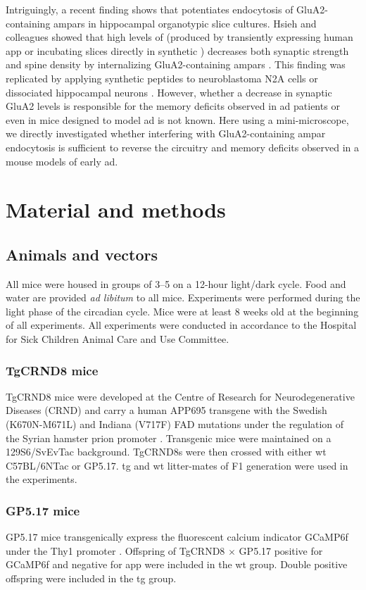 Intriguingly, a recent finding shows that \abeta{} potentiates endocytosis of GluA2-containing \glspl{ampar} in hippocampal organotypic slice cultures.  Hsieh and colleagues showed that high levels of \abeta{} (produced by transiently expressing human \gls{app} or incubating slices directly in synthetic \abeta) decreases both synaptic strength and spine density by internalizing GluA2-containing \glspl{ampar} \citep{hsieh06}. This finding was replicated by applying synthetic \abeta{} peptides to neuroblastoma N2A cells \citep{zhao10} or dissociated hippocampal neurons \citep{liu10, zhao10}. However, whether a decrease in synaptic GluA2 levels is responsible for the memory deficits observed in \gls{ad} patients or even in mice designed to model \gls{ad} is not known. Here using a mini-microscope, we directly investigated whether interfering with GluA2-containing \gls{ampar} endocytosis is sufficient to reverse the circuitry and memory deficits observed in a mouse models of early \gls{ad}.
\section{Material and methods}

\subsection{Animals and vectors}
All mice were housed in groups of 3--5 on a 12-hour light/dark cycle. Food and water are provided \textit{ad libitum} to all mice. Experiments were performed during the light phase of the circadian cycle. Mice were at least 8 weeks old at the beginning of all experiments. All experiments were conducted in accordance to the Hospital for Sick Children Animal Care and Use Committee.

\subsubsection{TgCRND8 mice}
TgCRND8 mice were developed at the Centre of Research for Neurodegenerative Diseases (CRND) and carry a human APP695 transgene with the Swedish (K670N-M671L) and Indiana (V717F) FAD mutations under the regulation of the Syrian hamster prion promoter \citep{chishti01}. Transgenic mice were maintained on a 129S6/SvEvTac background. TgCRND8s were then crossed with either \gls{wt} C57BL/6NTac or GP5.17. \Gls{tg} and \gls{wt} litter-mates of F1 generation were used in the experiments.


\subsubsection{GP5.17 mice}
GP5.17 mice transgenically express the fluorescent calcium indicator GCaMP6f under the Thy1 promoter \citep{dana14}. Offspring of TgCRND8 $\times$ GP5.17 positive for GCaMP6f and negative for \gls{app} were included in the \gls{wt} group. Double positive offspring were included in the \gls{tg} group.


